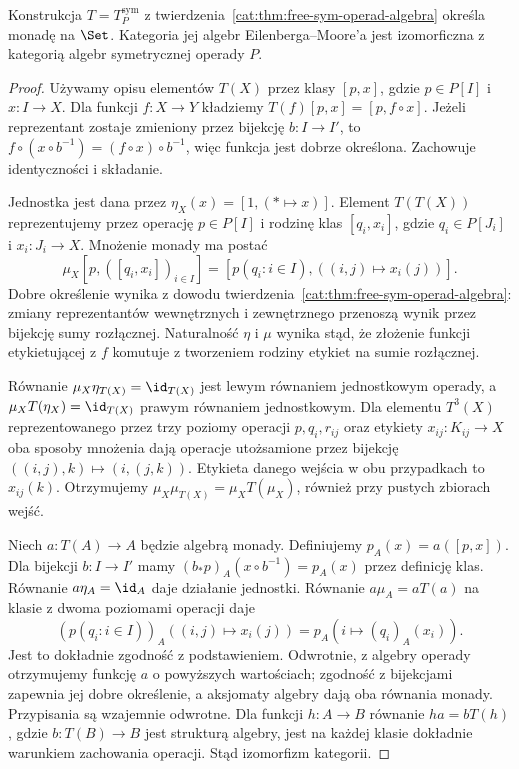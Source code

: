 \begin{stwierdzenie}\label{cat:prop:symmetric-operad-monad}
Konstrukcja $T=T_P^{\mathrm{sym}}$ z twierdzenia~\ref{cat:thm:free-sym-operad-algebra} określa monadę na $\Set$. Kategoria jej algebr Eilenberga--Moore'a jest izomorficzna z kategorią algebr symetrycznej operady $P$.
\end{stwierdzenie}
\begin{proof}
Używamy opisu elementów $T(X)$ przez klasy $[p,x]$, gdzie $p\in P[I]$ i $x:I\to X$. Dla funkcji $f:X\to Y$ kładziemy $T(f)[p,x]=[p,f\circ x]$. Jeżeli reprezentant zostaje zmieniony przez bijekcję $b:I\to I'$, to $f\circ(x\circ b^{-1})=(f\circ x)\circ b^{-1}$, więc funkcja jest dobrze określona. Zachowuje identyczności i składanie.

Jednostka jest dana przez $\eta_X(x)=[1,(*\mapsto x)]$. Element $T(T(X))$ reprezentujemy przez operację $p\in P[I]$ i rodzinę klas $[q_i,x_i]$, gdzie $q_i\in P[J_i]$ i $x_i:J_i\to X$. Mnożenie monady ma postać
\[
 \mu_X[p,([q_i,x_i])_{i\in I}]
 =[p(q_i:i\in I),((i,j)\mapsto x_i(j))].
\]
Dobre określenie wynika z dowodu twierdzenia~\ref{cat:thm:free-sym-operad-algebra}: zmiany reprezentantów wewnętrznych i zewnętrznego przenoszą wynik przez bijekcję sumy rozłącznej. Naturalność $\eta$ i $\mu$ wynika stąd, że złożenie funkcji etykietującej z $f$ komutuje z tworzeniem rodziny etykiet na sumie rozłącznej.

Równanie $\mu_X\eta_{T(X)}=\id_{T(X)}$ jest lewym równaniem jednostkowym operady, a $\mu_X T(\eta_X)=\id_{T(X)}$ prawym równaniem jednostkowym. Dla elementu $T^3(X)$ reprezentowanego przez trzy poziomy operacji $p,q_i,r_{ij}$ oraz etykiety $x_{ij}:K_{ij}\to X$ oba sposoby mnożenia dają operacje utożsamione przez bijekcję $((i,j),k)\mapsto(i,(j,k))$. Etykieta danego wejścia w obu przypadkach to $x_{ij}(k)$. Otrzymujemy $\mu_X\mu_{T(X)}=\mu_X T(\mu_X)$, również przy pustych zbiorach wejść.

Niech $a:T(A)\to A$ będzie algebrą monady. Definiujemy $p_A(x)=a([p,x])$. Dla bijekcji $b:I\to I'$ mamy $(b_*p)_A(x\circ b^{-1})=p_A(x)$ przez definicję klas. Równanie $a\eta_A=\id_A$ daje działanie jednostki. Równanie $a\mu_A=aT(a)$ na klasie z dwoma poziomami operacji daje
\[
 (p(q_i:i\in I))_A((i,j)\mapsto x_i(j))
 =p_A(i\mapsto(q_i)_A(x_i)).
\]
Jest to dokładnie zgodność z podstawieniem. Odwrotnie, z algebry operady otrzymujemy funkcję $a$ o powyższych wartościach; zgodność z bijekcjami zapewnia jej dobre określenie, a aksjomaty algebry dają oba równania monady. Przypisania są wzajemnie odwrotne. Dla funkcji $h:A\to B$ równanie $ha=bT(h)$, gdzie $b:T(B)\to B$ jest strukturą algebry, jest na każdej klasie dokładnie warunkiem zachowania operacji. Stąd izomorfizm kategorii.
\end{proof}

